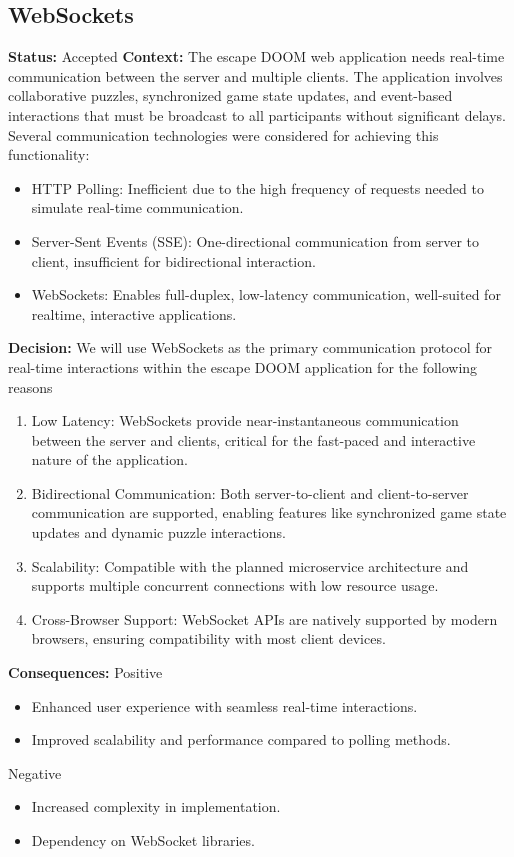\subsection{WebSockets}
\textbf{Status:} Accepted
\newline
\newline
\textbf{Context:}
The escape DOOM web application needs real-time communication between the server and multiple clients. The application involves collaborative puzzles, synchronized game state updates, and event-based interactions that must be broadcast to all participants without significant delays.\newline
Several communication technologies were considered for achieving this functionality:
\begin{itemize}
    \item HTTP Polling: Inefficient due to the high frequency of requests needed to simulate
real-time communication.
    \item Server-Sent Events (SSE): One-directional communication from server to client,
insufficient for bidirectional interaction.
    \item WebSockets: Enables full-duplex, low-latency communication, well-suited for realtime, interactive applications.
\end{itemize}
\textbf{Decision:}
We will use WebSockets as the primary communication protocol for real-time interactions within the escape DOOM application for the following reasons

\begin{enumerate}
    \item Low Latency: WebSockets provide near-instantaneous communication between the server and clients, critical for the fast-paced and interactive nature of the application.
    \item Bidirectional Communication: Both server-to-client and client-to-server communication are supported, enabling features like synchronized game state updates and dynamic puzzle interactions.
    \item Scalability: Compatible with the planned microservice architecture and supports multiple concurrent connections with low resource usage.
    \item Cross-Browser Support: WebSocket APIs are natively supported by modern browsers, ensuring compatibility with most client devices.
\end{enumerate}
\textbf{Consequences:}
\newline
\newline
Positive
\begin{itemize}
    \item Enhanced user experience with seamless real-time interactions.
    \item Improved scalability and performance compared to polling methods.
\end{itemize}
Negative
\begin{itemize}
    \item Increased complexity in implementation.
    \item Dependency on WebSocket libraries.
\end{itemize}


